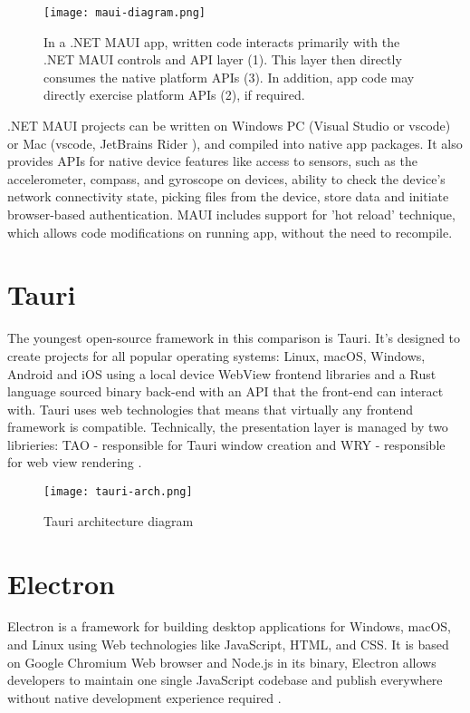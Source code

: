 \begin{figure}[H]
    \centering
    \texttt{[image: maui-diagram.png]}
    \caption[MAUI architecture]{\label{fig:maui} In a .NET MAUI app, written code interacts primarily  with the .NET MAUI controls and API layer (1). This layer then directly consumes the native platform APIs (3). In addition, app code may directly exercise platform APIs (2), if required. \autocite{MAUIDocs}}
\end{figure}

.NET MAUI projects can be written on Windows PC (Visual Studio or vscode) or Mac (vscode, JetBrains Rider \autocite{JBrainsRider}), and compiled into native app packages.
It also  provides APIs for native device features like access to sensors, such as the accelerometer, compass, and gyroscope on devices, ability to check the device's network connectivity state, picking files from the device, store data and initiate browser-based authentication. MAUI includes support for 'hot reload' technique, which allows code modifications on running app, without the need to recompile. 




\section{{Tauri}}%
\label{sec:tauri}

The youngest open-source framework in this comparison is Tauri. It's designed to create projects for all popular operating systems: Linux, macOS, Windows, Android and iOS using a local device WebView \autocite{WebView} frontend libraries and a Rust language \autocite{RustWiki} sourced binary back-end with an API that the front-end can interact with. Tauri uses web technologies that means that virtually any frontend framework is compatible. Technically, the presentation layer is managed by two librieries: TAO - responsible for Tauri window creation and WRY - responsible for web view rendering \autocite{TauriDoc}. 

\begin{figure}[H]
    \centering
    \texttt{[image: tauri-arch.png]}
    \caption[Tauri architecture]{\label{fig:tauri} Tauri architecture diagram }
\end{figure}


\section{{Electron}}%
\label{sec:electron}
Electron is a framework for building desktop applications for Windows, macOS, and Linux using Web technologies like JavaScript, HTML, and CSS. It is based on Google Chromium Web browser and Node.js in its binary, Electron allows developers to maintain one single JavaScript codebase and publish everywhere without native development experience required \autocite{ElectronDoc}.

